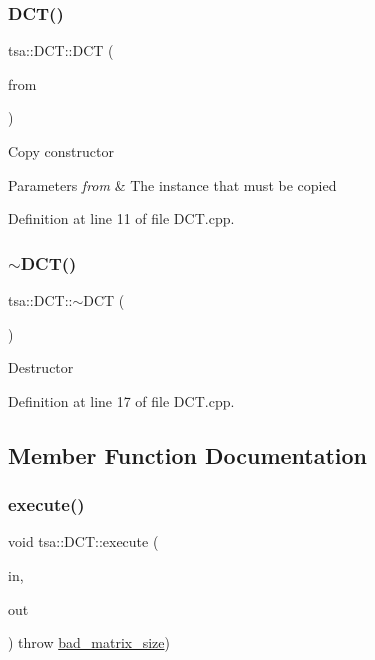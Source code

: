 \subsubsection{\texorpdfstring{D\+C\+T()}{DCT()}\hspace{0.1cm}{\footnotesize\ttfamily [2/2]}}
{\footnotesize\ttfamily tsa\+::\+D\+C\+T\+::\+D\+CT (\begin{DoxyParamCaption}\item[{const \hyperlink{classtsa_1_1_d_c_t}{D\+CT} \&}]{from }\end{DoxyParamCaption})}

Copy constructor


\begin{DoxyParams}{Parameters}
{\em from} & The instance that must be copied \\
\hline
\end{DoxyParams}


Definition at line 11 of file D\+C\+T.\+cpp.

\mbox{\label{classtsa_1_1_d_c_t_a014240a8695d47e1f8191d108e88032f}} 
\subsubsection{\texorpdfstring{$\sim$\+D\+C\+T()}{~DCT()}}
{\footnotesize\ttfamily tsa\+::\+D\+C\+T\+::$\sim$\+D\+CT (\begin{DoxyParamCaption}{ }\end{DoxyParamCaption})\hspace{0.3cm}{\ttfamily [virtual]}}

Destructor 

Definition at line 17 of file D\+C\+T.\+cpp.



\subsection{Member Function Documentation}
\mbox{\label{classtsa_1_1_d_c_t_ad659700e6288deb47359fb3797ecae21}} 
\subsubsection{\texorpdfstring{execute()}{execute()}\hspace{0.1cm}{\footnotesize\ttfamily [1/2]}}
{\footnotesize\ttfamily void tsa\+::\+D\+C\+T\+::execute (\begin{DoxyParamCaption}\item[{\hyperlink{namespacetsa_ad260cd21c1891c4ed391fe788569aba4}{Dmatrix} \&}]{in,  }\item[{\hyperlink{namespacetsa_ad260cd21c1891c4ed391fe788569aba4}{Dmatrix} \&}]{out }\end{DoxyParamCaption}) throw  \hyperlink{classtsa_1_1bad__matrix__size}{bad\+\_\+matrix\+\_\+size}) }

